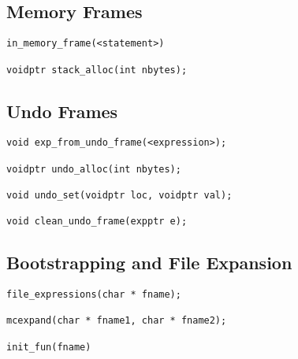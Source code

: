 \documentclass{article}
\begin{document}
\subsection{Memory Frames}

\begin{verbatim}
in_memory_frame(<statement>)

voidptr stack_alloc(int nbytes);
\end{verbatim}

\subsection{Undo Frames}

\begin{verbatim}
void exp_from_undo_frame(<expression>);

voidptr undo_alloc(int nbytes);

void undo_set(voidptr loc, voidptr val);

void clean_undo_frame(expptr e);
\end{verbatim}

\subsection{Bootstrapping and File Expansion}

\begin{verbatim}
file_expressions(char * fname);

mcexpand(char * fname1, char * fname2);

init_fun(fname)
\end{verbatim}




\end{document}
